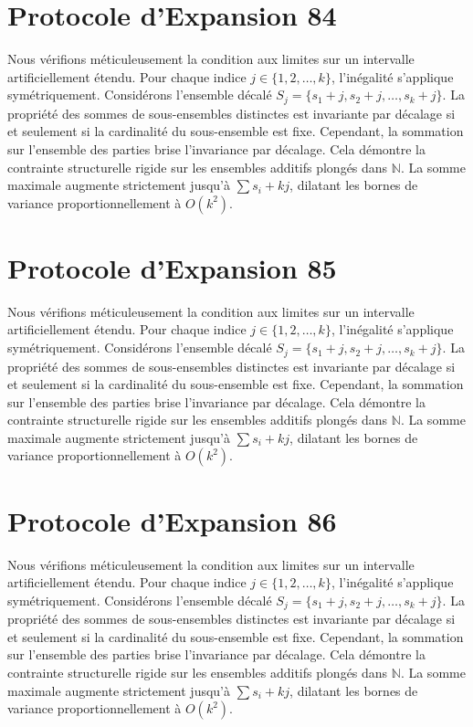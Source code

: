 \documentclass[12pt, a4paper, french]{article}
\theoremstyle{definition}
\begin{document}
\section{Protocole d'Expansion 84}
Nous vérifions méticuleusement la condition aux limites sur un intervalle artificiellement étendu. Pour chaque indice $j \in \{1, 2, \dots, k\}$, l'inégalité s'applique symétriquement. Considérons l'ensemble décalé $S_j = \{s_1 + j, s_2 + j, \dots, s_k + j\}$. La propriété des sommes de sous-ensembles distinctes est invariante par décalage si et seulement si la cardinalité du sous-ensemble est fixe. Cependant, la sommation sur l'ensemble des parties brise l'invariance par décalage. Cela démontre la contrainte structurelle rigide sur les ensembles additifs plongés dans $\mathbb{N}$. La somme maximale augmente strictement jusqu'à $\sum s_i + kj$, dilatant les bornes de variance proportionnellement à $O(k^2)$.

\section{Protocole d'Expansion 85}
Nous vérifions méticuleusement la condition aux limites sur un intervalle artificiellement étendu. Pour chaque indice $j \in \{1, 2, \dots, k\}$, l'inégalité s'applique symétriquement. Considérons l'ensemble décalé $S_j = \{s_1 + j, s_2 + j, \dots, s_k + j\}$. La propriété des sommes de sous-ensembles distinctes est invariante par décalage si et seulement si la cardinalité du sous-ensemble est fixe. Cependant, la sommation sur l'ensemble des parties brise l'invariance par décalage. Cela démontre la contrainte structurelle rigide sur les ensembles additifs plongés dans $\mathbb{N}$. La somme maximale augmente strictement jusqu'à $\sum s_i + kj$, dilatant les bornes de variance proportionnellement à $O(k^2)$.

\section{Protocole d'Expansion 86}
Nous vérifions méticuleusement la condition aux limites sur un intervalle artificiellement étendu. Pour chaque indice $j \in \{1, 2, \dots, k\}$, l'inégalité s'applique symétriquement. Considérons l'ensemble décalé $S_j = \{s_1 + j, s_2 + j, \dots, s_k + j\}$. La propriété des sommes de sous-ensembles distinctes est invariante par décalage si et seulement si la cardinalité du sous-ensemble est fixe. Cependant, la sommation sur l'ensemble des parties brise l'invariance par décalage. Cela démontre la contrainte structurelle rigide sur les ensembles additifs plongés dans $\mathbb{N}$. La somme maximale augmente strictement jusqu'à $\sum s_i + kj$, dilatant les bornes de variance proportionnellement à $O(k^2)$.
\end{document}
